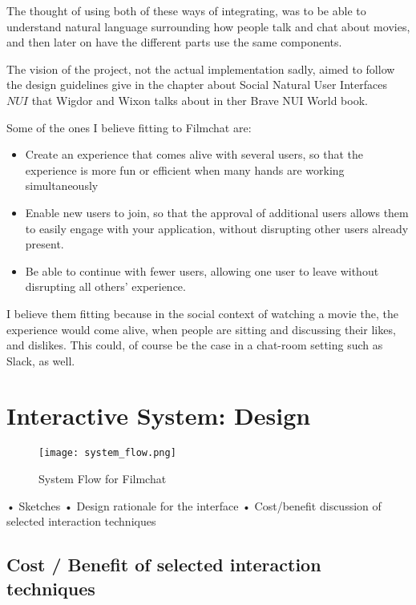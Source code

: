 \documentclass[11pt,fleqn]{book} %
\begin{document}
The thought of using both of these ways of integrating, was to be able to understand natural language surrounding how people talk and chat about movies, and then later on have the different parts use the same components.

The vision of the project, not the actual implementation sadly, aimed to follow the design guidelines give in the chapter about Social Natural User Interfaces \(NUI\) that Wigdor and Wixon talks about in ther Brave NUI World book. \cite{WigdorBraveWorld}

Some of the ones I believe fitting to Filmchat are:
\begin{itemize}
\item Create an experience that comes alive with several users, so that the experience
is more fun or efficient when many hands are working simultaneously
\item Enable new users to join, so that the approval of additional users allows them
to easily engage with your application, without disrupting other users already
present.
\item Be able to continue with fewer users, allowing one user to leave without disrupting all others’ experience.
\end{itemize}
I believe them fitting because in the social context of watching a movie the, the experience would come alive, when people are sitting and discussing their likes, and dislikes.
This could, of course be the case in a chat-room setting such as Slack, as well.

\chapter{Interactive System: Design}
\begin{figure}[]
  \centering
   \texttt{[image: system\_flow.png]}
  \caption{System Flow for Filmchat}
  \label{fig:system_flow}
\end{figure}
•	Sketches
•	Design rationale for the interface
•	Cost/benefit discussion of selected interaction techniques

\section{Cost / Benefit of selected interaction techniques}
\end{document}
